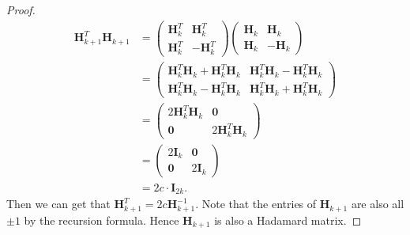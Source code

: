 \begin{enumerate}
{\begin{proof}
    $$
    \begin{aligned}
    \bm{H}_{k+1}^{T} \bm{H}_{k+1} & = \left(\begin{array}{cc}
        \bm{H}_{k}^T &  \bm{H}_{k}^T\\
         \bm{H}_{k}^T& -\bm{H}_{k}^T
    \end{array}\right)  \left(\begin{array}{cc}
        \bm{H}_{k} &  \bm{H}_{k}\\
         \bm{H}_{k} & -\bm{H}_{k}
    \end{array}\right)\\
    &= \left(\begin{array}{cc}
         \bm{H}_{k}^T \bm{H}_{k} + \bm{H}_{k}^T\bm{H}_{k}& \bm{H}_{k}^T \bm{H}_{k}-\bm{H}_{k}^T \bm{H}_{k} \\
         \bm{H}_{k}^T \bm{H}_{k} - \bm{H}_{k}^T \bm{H}_{k}& \bm{H}_{k}^T \bm{H}_{k}+\bm{H}_{k}^T \bm{H}_{k} 
    \end{array}\right) \\
    &= \left( \begin{array}{cc}
         2\bm{H}_{k}^T \bm{H}_k& \bm{0} \\
         \bm{0}& 2\bm{H}_{k}^T \bm{H}_k 
    \end{array} \right) \\
    &= \left( \begin{array}{cc}
         2\bm{I}_k & \bm{0} \\
         \bm{0}& 2\bm{I}_k 
    \end{array} \right) \\
    &= 2c \cdot \bm{I}_{2k}.
    \end{aligned}
    $$
    Then we can get that $\bm{H}_{k+1}^{T} = 2c \bm{H}_{k+1}^{-1}$. Note that the entries of $\bm{H}_{k+1}$ are also all $\pm 1$ by the recursion formula. Hence $\bm{H}_{k+1}$ is also a Hadamard matrix.
    \end{proof}
    }
\end{enumerate}
